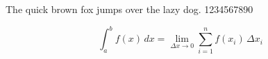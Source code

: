 \documentclass{article}
\newcommand{\pangram}[1]{{#1 The quick brown fox jumps over
  the lazy dog. 1234567890\par}}
\begin{document}
\large
\pangram{\sffamily}
\[
  \int_a^b \! f(x) \, dx = \lim_{\Delta x \rightarrow 0}
  \sum_{i=1}^{n} f(x_i) \,\Delta x_i
\]
\end{document}
